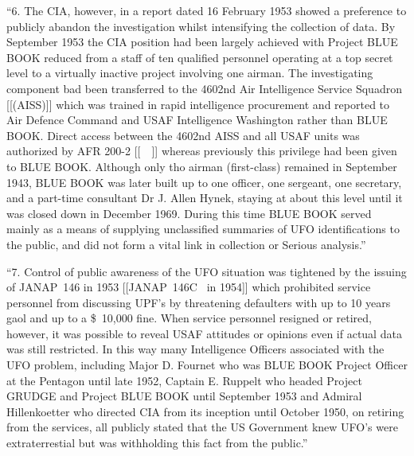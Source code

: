\begin{svgraybox}
``6. The CIA, however, in a report dated 16 February 1953 showed
a preference to publicly abandon the investigation whilst intensifying
the collection of data. By September 1953 the CIA position had been
largely achieved with Project BLUE BOOK reduced from a staff of ten
qualified personnel operating at a top secret level to a virtually
inactive project involving one airman. The investigating component
bad been transferred to the 4602nd Air Intelligence Service Squadron [[(AISS)]]
which was trained in rapid intelligence procurement and reported to
Air Defence Command and USAF Intelligence Washington rather than
BLUE BOOK. Direct access between the 4602nd AISS and all USAF units
was authorized by AFR 200-2 [[~\cite{AFR200-2}~]] whereas previously this privilege had
been given to BLUE BOOK. Although only tho airman (first-class)
remained in September 1943, BLUE BOOK was later built up to one
officer, one sergeant, one secretary, and a part-time consultant
Dr J. Allen Hynek, staying at about this level until it was closed
down in December 1969. During this time BLUE BOOK served mainly
as a means of supplying unclassified summaries of UFO identifications
to the public, and did not form a vital link in collection or
Serious analysis.''

%
%
%
``7. Control of public awareness of the UFO situation was
tightened by the issuing of JANAP~146  in 1953
[[JANAP~146C~\cite{JANAP_146C} in 1954]]
which prohibited
service personnel from discussing UPF's by threatening defaulters
with up to 10 years gaol and up to a {\$}~10,000 fine. When service
personnel resigned or retired, however, it was possible to reveal
USAF attitudes or opinions even if actual data was still restricted.
In this way many Intelligence Officers associated with the UFO problem,
including Major D. Fournet who was BLUE BOOK Project Officer at the
Pentagon until late 1952, Captain E. Ruppelt who headed Project
GRUDGE and Project BLUE BOOK until September 1953 and Admiral
Hillenkoetter who directed CIA from its inception until October 1950,
on retiring from the services, all publicly stated that the US
Government knew UFO's were extraterrestial but was withholding
this fact from the public.''


\end{svgraybox}
